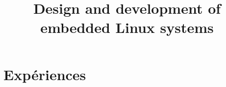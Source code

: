 \documentclass[11pt,a4paper,sans]{moderncv}   %
\title{Design and development of embedded Linux systems}                          %
\begin{document}
\makecvtitle

\section{Expériences}
\end{document}
